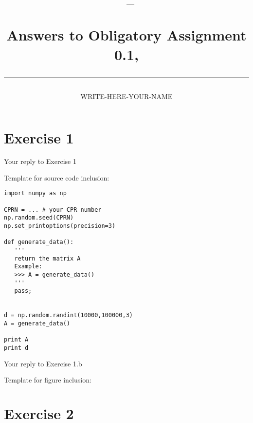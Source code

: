 \documentclass[a4paper,10pt]{article}
\author{WRITE-HERE-YOUR-NAME}
\title{\begin{flushleft}
\vspace{-4ex}
\courseid~-- \coursename \\[0.2cm]
{\Large Answers to Obligatory Assignment 0.1, \term \\[3ex]
\hrule}
\end{flushleft}
}
\date{}
\begin{document}
\maketitle

\section*{Exercise 1}



Your reply to Exercise 1


Template for source code inclusion:

\begin{lstlisting}
import numpy as np

CPRN = ... # your CPR number
np.random.seed(CPRN)
np.set_printoptions(precision=3)

def generate_data():
   '''
   return the matrix A
   Example:
   >>> A = generate_data()
   '''
   pass;


d = np.random.randint(10000,100000,3)
A = generate_data() 

print A
print d
\end{lstlisting}


Your reply to Exercise 1.b


Template for figure inclusion:

\begin{figure}[htb]
\begin{center}
\end{center}
\end{figure}

\newpage
\section*{Exercise 2}
\end{document}
